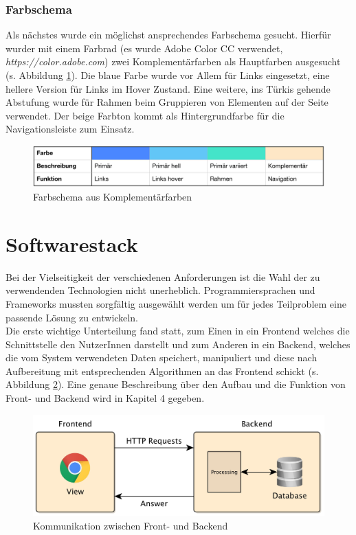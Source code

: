 \subsubsection{Farbschema}

Als nächstes wurde ein möglichst ansprechendes Farbschema gesucht. Hierfür wurder mit einem Farbrad (es wurde Adobe Color CC verwendet, \textit{https://color.adobe.com}) zwei Komplementärfarben als Hauptfarben ausgesucht (s. Abbildung \ref{fig:colors}). Die blaue Farbe wurde vor Allem für Links eingesetzt, eine hellere Version für Links im Hover Zustand. Eine weitere, ins Türkis gehende Abstufung wurde für Rahmen beim Gruppieren von Elementen auf der Seite verwendet. Der beige Farbton kommt als Hintergrundfarbe für die Navigationsleiste zum Einsatz.

\begin{figure}[h!]
	\centering
	\includegraphics[width=.95\linewidth]{figures/farbschema}
	\caption{Farbschema aus Komplementärfarben}
	\label{fig:colors}
\end{figure}


\section{Softwarestack}

Bei der Vielseitigkeit der verschiedenen Anforderungen ist die Wahl der zu verwendenden Technologien nicht unerheblich. Programmiersprachen und Frameworks mussten sorgfältig ausgewählt werden um für jedes Teilproblem eine passende Lösung zu entwickeln.\\
Die erste wichtige Unterteilung fand statt, zum Einen in ein Frontend welches die Schnittstelle den NutzerInnen darstellt und zum Anderen in ein Backend, welches die vom System verwendeten Daten speichert, manipuliert und diese nach Aufbereitung mit entsprechenden Algorithmen an das Frontend schickt (s. Abbildung \ref{fig:frontendbackend}). Eine genaue Beschreibung über den Aufbau und die Funktion von Front- und Backend wird in Kapitel 4 gegeben.\\

\begin{figure}[h!]
	\centering
	\includegraphics[width=.8\linewidth]{figures/frontendbackend}
	\caption{Kommunikation zwischen Front- und Backend}
	\label{fig:frontendbackend}
\end{figure}

